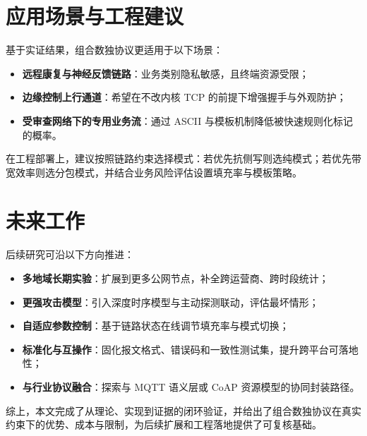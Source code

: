 \section{应用场景与工程建议}
基于实证结果，组合数独协议更适用于以下场景：
\begin{itemize}
  \item \textbf{远程康复与神经反馈链路}：业务类别隐私敏感，且终端资源受限；
  \item \textbf{边缘控制上行通道}：希望在不改内核 TCP 的前提下增强握手与外观防护；
  \item \textbf{受审查网络下的专用业务流}：通过 ASCII 与模板机制降低被快速规则化标记的概率。
\end{itemize}

在工程部署上，建议按照链路约束选择模式：若优先抗侧写则选纯模式；若优先带宽效率则选分包模式，并结合业务风险评估设置填充率与模板策略。

\section{未来工作}
后续研究可沿以下方向推进：
\begin{itemize}
  \item \textbf{多地域长期实验}：扩展到更多公网节点，补全跨运营商、跨时段统计；
  \item \textbf{更强攻击模型}：引入深度时序模型与主动探测联动，评估最坏情形；
  \item \textbf{自适应参数控制}：基于链路状态在线调节填充率与模式切换；
  \item \textbf{标准化与互操作}：固化报文格式、错误码和一致性测试集，提升跨平台可落地性；
  \item \textbf{与行业协议融合}：探索与 MQTT 语义层或 CoAP 资源模型的协同封装路径。
\end{itemize}

综上，本文完成了从理论、实现到证据的闭环验证，并给出了组合数独协议在真实约束下的优势、成本与限制，为后续扩展和工程落地提供了可复核基础。
